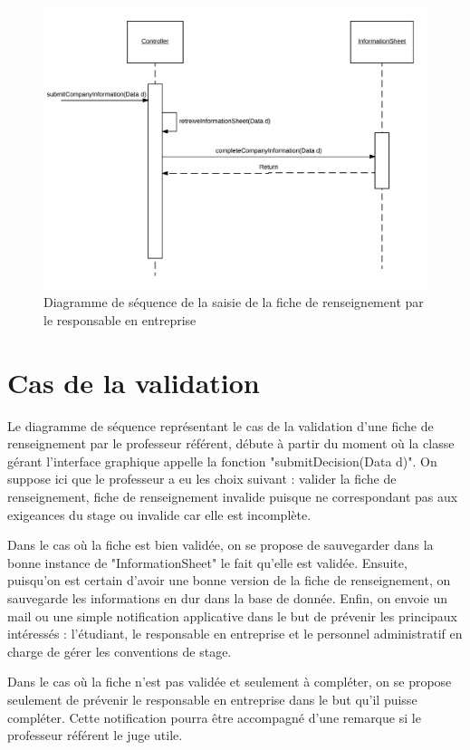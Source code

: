 \documentclass{scrreprt}
\begin{document}
\begin{figure}[h]
\centering
\includegraphics[width=15cm]{images/submitCompanySeqDiagram.png}
\caption{Diagramme de séquence de la saisie de la fiche de renseignement par le responsable en entreprise}
\end{figure}

\newpage
\section{Cas de la validation}

	Le diagramme de séquence représentant le cas de la validation d'une fiche de renseignement par le professeur référent, débute 
à partir du moment où la classe gérant l'interface graphique appelle la fonction "submitDecision(Data d)". On suppose ici que 
le professeur a eu les choix suivant : valider la fiche de renseignement, fiche de renseignement invalide puisque ne correspondant 
pas aux exigeances du stage ou invalide car elle est incomplète. 

	Dans le cas où la fiche est bien validée, on se propose de sauvegarder dans la bonne instance de "InformationSheet" le fait qu'elle est 
validée. Ensuite, puisqu'on est certain d'avoir une bonne version de la fiche de renseignement, on sauvegarde les informations en dur 
dans la base de donnée. Enfin, on envoie un mail ou une simple notification applicative dans le but de prévenir les principaux intéressés :
l'étudiant, le responsable en entreprise et le personnel administratif en charge de gérer les conventions de stage.

	Dans le cas où la fiche n'est pas validée et seulement à compléter, on se propose seulement de prévenir le responsable en entreprise dans 
le but qu'il puisse compléter. Cette notification pourra être accompagné d'une remarque si le professeur référent le juge utile. 
\end{document}
